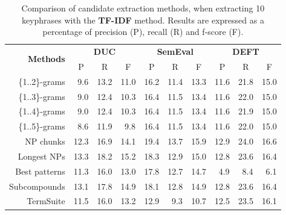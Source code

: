     \begin{table}[h]
      \centering
      \begin{tabular}{rccccccccc}
        \toprule
        \multirow{2}{*}[-2pt]{\textbf{Methods}} & \multicolumn{3}{c}{\textbf{DUC}} & \multicolumn{3}{c}{\textbf{SemEval}} & \multicolumn{3}{c}{\textbf{DEFT}}\\
        \cmidrule(r){2-4}\cmidrule(lr){5-7}\cmidrule(l){8-10}
        & P & R & F & P & R & F & P & R & F\\
        \midrule
        \{1..2\}-grams & ${~~}$9.6 & 13.2 & 11.0 & 16.2 & 11.4 & 13.3 & 11.6 & 21.8 & 15.0\\
        \{1..3\}-grams & ${~~}$9.0 & 12.4 & 10.3 & 16.4 & 11.5 & 13.4 & 11.6 & 22.0 & 15.0\\
        \{1..4\}-grams & ${~~}$9.0 & 12.4 & 10.3 & 16.4 & 11.5 & 13.4 & 11.6 & 21.9 & 15.0\\
        \{1..5\}-grams & ${~~}$8.6 & 11.9 & $~~$9.8 & 16.4 & 11.5 & 13.4 & 11.6 & 22.0 & 15.0\\
        NP chunks & 12.3 & 16.9 & 14.1 & 19.4 & 13.7 & 15.9 & 12.9 & 24.0 & 16.6\\
        Longest NPs & 13.3 & 18.2 & 15.2 & 18.3 & 12.9 & 15.0 & 12.8 & 23.6 & 16.4\\
        Best patterns & 11.3 & 16.0 & 13.0 & 17.8 & 12.7 & 14.7 & $~~$4.9 & $~~$8.4 & $~~$6.1\\
        Subcompounds & 13.1 & 17.8 & 14.9 &18.1 & 12.8 & 14.9 & 12.8 & 23.6 & 16.4\\
        TermSuite & 11.5 & 16.0 & 13.2 & 12.9 & ${~~}$9.3 & 10.7 & 12.5 & 23.5 & 16.1\\
        \bottomrule
      \end{tabular}
      \caption{Comparison of candidate extraction methods, when extracting 10
               keyphrases with the \textbf{TF-IDF} method. Results are expressed
               as a percentage of precision (P), recall (R) and f-score (F).
               \label{tab:keyphrase_extraction_results}}
    \end{table}

